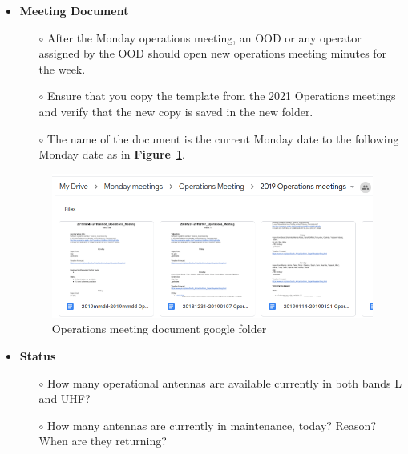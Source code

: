 \begin{itemize}
	\item \textbf{Meeting Document}

\begin{itemize} 
\item[$\circ$] After the Monday operations meeting, an OOD or any operator assigned by the OOD should open new operations meeting minutes for the week. 
\item[$\circ$] Ensure that you copy the template from the 2021 Operations meetings and verify that the new copy is saved in the new folder.
\item[$\circ$] The name of the document is the current Monday date to the following Monday date as in \textbf{Figure}~\ref{fig:image86}.
\end{itemize}
\begin{figure}[!thb]
	\centering
	\includegraphics[scale=0.53]{Chapters/images/image86.png}
	
	\caption{Operations meeting document google folder}
	\label{fig:image86}
\end{figure}


\item \textbf{Status}
\begin{itemize} 
\item[$\circ$] How many operational antennas are available currently in both bands L and UHF?
\item[$\circ$] How many antennas are currently in maintenance, today? Reason? When are they returning?


\end{itemize}
\end{itemize}
